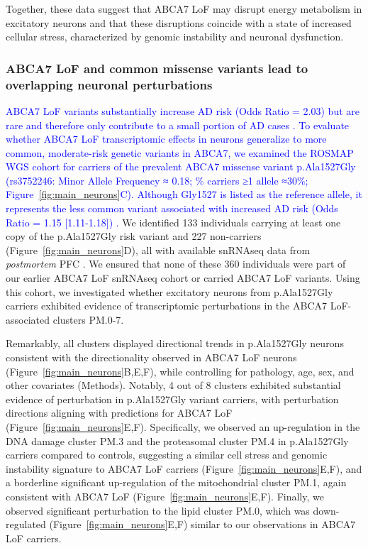 \documentclass[12pt]{article}
\begin{document}
Together, these data suggest that ABCA7 LoF may disrupt energy metabolism in excitatory neurons and that these disruptions coincide with a state of increased cellular stress, characterized by genomic instability and neuronal dysfunction.

\subsubsection{ABCA7 LoF and common missense variants lead to overlapping neuronal perturbations}
\newcommand{\quoteL}{\textcolor{blue}{ABCA7 LoF variants substantially increase AD risk (Odds Ratio = 2.03) \cite{Steinberg2015-mu} but are rare and therefore only contribute to a small portion of AD cases \cite{Duchateau2024-rf}. To evaluate whether ABCA7 LoF transcriptomic effects in neurons generalize to more common, moderate-risk genetic variants in ABCA7, we examined the ROSMAP WGS cohort for carriers of the prevalent ABCA7 missense variant p.Ala1527Gly (rs3752246: Minor Allele Frequency ≈ 0.18; \% carriers ≥1 allele ≈30\%; Figure~\ref{fig:main_neurons}C). Although Gly1527 is listed as the reference allele, it represents the less common variant associated with increased AD risk (Odds Ratio = 1.15 [1.11-1.18]) \cite{Kunkle2019-yo,Holstege2022-vp,Naj2011-bs}. \label{quoteL-label}}} 
\quoteL We identified 133 individuals carrying at least one copy of the p.Ala1527Gly risk variant and 227 non-carriers (Figure~\ref{fig:main_neurons}D), all with available snRNAseq data from \textit{postmortem} PFC \cite{Mathys2023-rs}. We ensured that none of these 360 individuals were part of our earlier ABCA7 LoF snRNAseq cohort or carried ABCA7 LoF variants. Using this cohort, we investigated whether excitatory neurons from p.Ala1527Gly carriers exhibited evidence of transcriptomic perturbations in the ABCA7 LoF-associated clusters PM.0-7.

Remarkably, all clusters displayed directional trends in p.Ala1527Gly neurons consistent with the directionality observed in ABCA7 LoF neurons (Figure~\ref{fig:main_neurons}B,E,F), while controlling for pathology, age, sex, and other covariates (Methods). Notably, 4 out of 8 clusters exhibited substantial evidence of perturbation in p.Ala1527Gly variant carriers, with perturbation directions aligning with predictions for ABCA7 LoF (Figure~\ref{fig:main_neurons}E,F). Specifically, we observed an up-regulation in the DNA damage cluster PM.3 and the proteasomal cluster PM.4 in p.Ala1527Gly carriers compared to controls, suggesting a similar cell stress and genomic instability signature to ABCA7 LoF carriers (Figure~\ref{fig:main_neurons}E,F), and a borderline significant up-regulation of the mitochondrial cluster PM.1, again consistent with ABCA7 LoF (Figure~\ref{fig:main_neurons}E,F). Finally, we observed significant perturbation to the lipid cluster PM.0, which was down-regulated (Figure~\ref{fig:main_neurons}E,F) similar to our observations in ABCA7 LoF carriers. 
\end{document}
